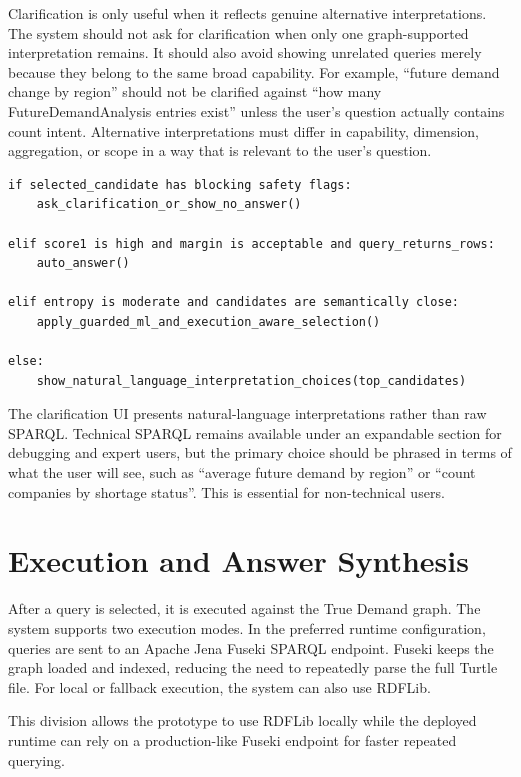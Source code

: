Clarification is only useful when it reflects genuine alternative interpretations. The system should not ask for clarification when only one graph-supported interpretation remains. It should also avoid showing unrelated queries merely because they belong to the same broad capability. For example, ``future demand change by region'' should not be clarified against ``how many FutureDemandAnalysis entries exist'' unless the user's question actually contains count intent. Alternative interpretations must differ in capability, dimension, aggregation, or scope in a way that is relevant to the user's question.

\begin{lstlisting}[caption={Confidence-aware decision policy.}, label={lst:confidence-routing-policy}]
if selected_candidate has blocking safety flags:
    ask_clarification_or_show_no_answer()

elif score1 is high and margin is acceptable and query_returns_rows:
    auto_answer()

elif entropy is moderate and candidates are semantically close:
    apply_guarded_ml_and_execution_aware_selection()

else:
    show_natural_language_interpretation_choices(top_candidates)
\end{lstlisting}

The clarification UI presents natural-language interpretations rather than raw SPARQL. Technical SPARQL remains available under an expandable section for debugging and expert users, but the primary choice should be phrased in terms of what the user will see, such as ``average future demand by region'' or ``count companies by shortage status''. This is essential for non-technical users.

\section{Execution and Answer Synthesis}
\label{sec:execution-answer-synthesis}

After a query is selected, it is executed against the True Demand graph. The system supports two execution modes. In the preferred runtime configuration, queries are sent to an Apache Jena Fuseki SPARQL endpoint. Fuseki keeps the graph loaded and indexed, reducing the need to repeatedly parse the full Turtle file. For local or fallback execution, the system can also use RDFLib.

This division allows the prototype to use RDFLib locally while the deployed runtime can rely on a production-like Fuseki endpoint for faster repeated querying.

